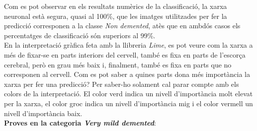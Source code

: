 \documentclass[a4paper,12pt]{article}
\begin{document}
Com es pot observar en els resultats numèrics de la classificació, la xarxa neuronal està segura, quasi al 100\%, que les imatges utilitzades per fer la predicció corresponen a la classe \textit{Non demented}, atès que en ambdós casos els percentatges de classificació són superiors al 99\%.\\
En la interpretació gràfica feta amb la llibreria \textit{Lime}, es pot veure com la xarxa a més de fixar-se en parts interiors del cervell, també es fixa en parts de l'escorça cerebral, però en grau més baix i, finalment, també es fixa en parts que no corresponen al cervell. Com es pot saber a quines parts dona més importància la xarxa per fer una predicció? Per saber-ho solament cal parar compte amb els colors de la interpretació. El color verd indica un nivell d'importància molt elevat per la xarxa, el color groc indica un nivell d'importància mig i el color vermell un nivell d'importància baix.\\
\textbf{Proves en la categoria \textit{Very mild demented}}:
\end{document}
